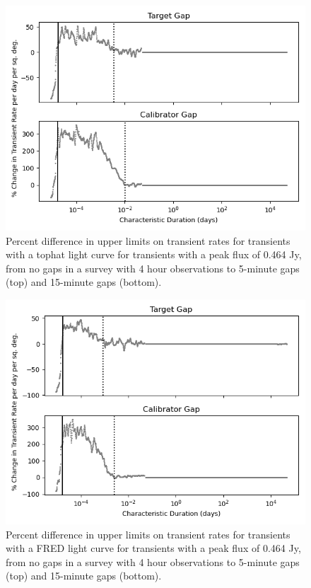 \documentclass[12pt]{article}
\begin{document}
 \begin{figure}
\includegraphics[width=\columnwidth]{figure7.png}
\caption{Percent difference in upper limits on transient rates for transients with a tophat light curve for transients with a peak flux of 0.464 Jy, from no gaps in a survey with 4 hour observations to 5-minute gaps (top) and 15-minute gaps (bottom).}
\label{fig7}
 \end{figure}
 
 \begin{figure}
\includegraphics[width=\columnwidth]{figure8.png}
\caption{Percent difference in upper limits on transient rates for transients with a FRED light curve for transients with a peak flux of 0.464 Jy, from no gaps in a survey with 4 hour observations to 5-minute gaps (top) and 15-minute gaps (bottom).}
\label{fig8}
 \end{figure}
 
\end{document}
